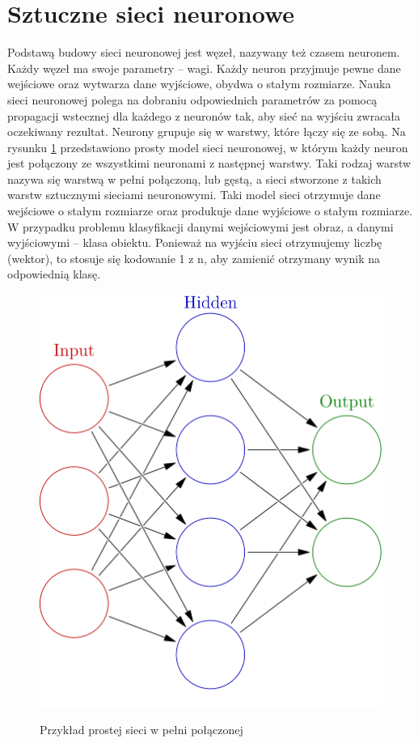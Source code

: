 \documentclass[a4paper,twoside,12pt]{book}
\begin{document}
\section{Sztuczne sieci neuronowe}
{Podstawą budowy sieci neuronowej jest węzeł, nazywany też czasem neuronem. Każdy węzeł ma swoje parametry – wagi. Każdy neuron przyjmuje pewne dane wejściowe oraz wytwarza dane wyjściowe, obydwa o stałym rozmiarze. Nauka sieci neuronowej polega na dobraniu odpowiednich parametrów za pomocą propagacji wstecznej dla każdego z neuronów tak, aby sieć na wyjściu zwracała oczekiwany rezultat. Neurony grupuje się w warstwy, które łączy się ze sobą. Na rysunku \ref{simplenetwork} przedstawiono prosty model sieci neuronowej, w którym każdy neuron jest połączony ze wszystkimi neuronami z następnej warstwy. Taki rodzaj warstw nazywa się warstwą w pełni połączoną, lub gęstą, a sieci stworzone z takich warstw sztucznymi sieciami neuronowymi. Taki model sieci otrzymuje dane wejściowe o stałym rozmiarze oraz produkuje dane wyjściowe o stałym rozmiarze. W przypadku problemu klasyfikacji danymi wejściowymi jest obraz, a danymi wyjściowymi – klasa obiektu. Ponieważ na wyjściu sieci otrzymujemy liczbę (wektor), to stosuje się kodowanie 1 z n, aby zamienić otrzymany wynik na odpowiednią klasę.

\begin{figure}[h!]
\caption{Przykład prostej sieci w pełni połączonej}

\centering
\includegraphics[scale=0.075]{Colored_neural_network.png}
\label{simplenetwork}
\end{figure}




}
\end{document}
